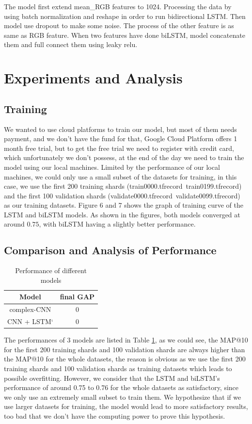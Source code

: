 \documentclass{article}
\begin{document}
The model first extend mean\_RGB features to 1024. Processing the data by using batch normalization and reshape in order to run bidirectional LSTM. Then model use dropout to make some noise. The process of the other feature is as same as RGB feature. When two features have done biLSTM, model concatenate them and full connect them using leaky relu. 



\section{Experiments and Analysis}
\subsection{Training}
We wanted to use cloud platforms to train our model, but most of them needs payment, and we don't have the fund for that, Google Cloud Platform offers 1 month free trial, but to get the free trial we need to register with credit card, which unfortunately we don't possess, at the end of the day we need to train the model using our local machines. Limited by the performance of our local machines, we could only use a small subset of the datasets for training, in this case, we use the first 200 training shards (train0000.tfrecord~train0199.tfrecord) and the first 100 validation shards (validate0000.tfrecord~validate0099.tfrecord) as our training datasets. Figure 6 and 7 shows the graph of training curve of the LSTM and biLSTM models. As shown in the figures, both models converged at around $0.75$, with biLSTM having a slightly better performance.



\subsection{Comparison and Analysis of Performance}
\begin{table} [h]
  \caption{Performance of different models}
  \label{table 1}
  \centering
  \begin{tabular}{c|c}
    \toprule
   	Model   	&  final GAP \\
    \midrule 
	complex-CNN & 0 \\

	CNN + LSTM` & 0  \\
    \bottomrule
  \end{tabular}
\end{table}
The performances of 3 models are listed in Table \ref{table 1}, as we could see, the MAP@10 for the first 200 training shards and 100 validation shards are always higher than the MAP@10 for the whole datasets, the reason is obvious as we use the first 200 training shards and 100 validation shards as training datasets which leads to possible overfitting. However, we consider that the LSTM and biLSTM's performance of around 0.75 to 0.76 for the whole datasets as satisfactory, since we only use an extremely small subset to train them. We hypothesize that if we use larger datasets for training, the model would lead to more satisfactory results, too bad that we don't have the computing power to prove this hypothesis.
\end{document}
